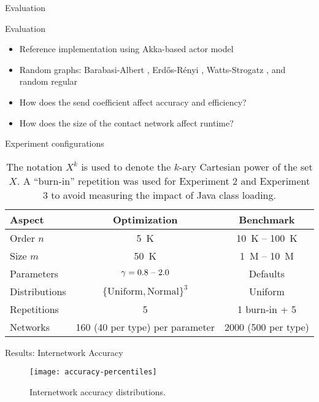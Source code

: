 \documentclass[11pt]{beamer}
\begin{document}
\begin{section}{Evaluation}

\begin{frame}{Evaluation}
\begin{itemize}
  \item Reference implementation using Akka-based actor model
  \pause
  \item Random graphs: Barabasi-Albert \citep{Barabasi1999}, Erd\H{o}s-R\'{e}nyi \citep{Erdos1959}, Watts-Strogatz \citep{Watts1998}, and random regular \citep{Kim2003}
  \pause
  \item How does the send coefficient affect accuracy and efficiency?
  \pause
  \item How does the size of the contact network affect runtime?

\end{itemize}
\end{frame}

\begin{frame}{Experiment configurations}
\begin{table}
  \centering
  \small
  \renewcommand{\arraystretch}{2}
  \begin{tabular}{lcc}
    \toprule
    Aspect & Optimization & Benchmark \\
    \midrule
    Order $n$ & \qty{5}{K} & \qty{10}{K} -- \qty{100}{K} \\
    Size $m$ & \qty{50}{K} & \qty{1}{M} -- \qty{10}{M} \\
    Parameters & $\gamma = \text{0.8 -- 2.0}$ & Defaults \\
    Distributions & $\{\text{Uniform}, \text{Normal}\}^3$ & Uniform \\
    Repetitions & 5 & 1 burn-in + 5 \\
    Networks & 160 (40 per type) per parameter & \num{2000} (500 per type) \\
    \bottomrule
  \end{tabular}
  \caption[Experiment configurations]{The notation $X^k$ is used to denote the $k$-ary Cartesian power of the set $X$. A ``burn-in'' repetition was used for Experiment 2 and Experiment 3 to avoid measuring the impact of Java class loading.}
\end{table}
\end{frame}

\begin{frame}{Results: Internetwork Accuracy}
\begin{figure}
  \centering
  \texttt{[image: accuracy-percentiles]}
  \caption[Cumulative accuracy distributions]{Internetwork accuracy distributions.}
\end{figure}
\end{frame}


\end{section}
\end{document}
